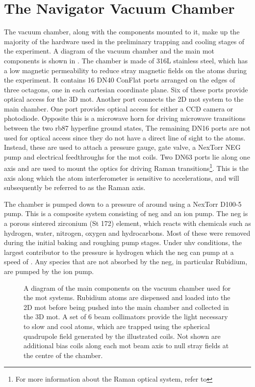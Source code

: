 \section{The Navigator Vacuum Chamber}\label{sec:vacuum_chamber}
The vacuum chamber, along with the components mounted to it, make up the
majority of the hardware used in the preliminary trapping and cooling stages of
the experiment. A diagram of the
vacuum chamber and the main \ac{mot} components is shown in
. The chamber is made of 316L stainless steel, which has a low magnetic permeability to reduce stray magnetic fields on the atoms during the experiment.  It contains 16 DN40 ConFlat ports arranged
on the edges of three octagons, one in each cartesian coordinate plane. Six of
these ports provide optical access for the 3D \ac{mot}. Another port connects the 2D \ac{mot} system to the main chamber. One port provides optical access for either a CCD camera or photodiode. Opposite this is a microwave horn for driving microwave transitions between the two \ac{rb87} hyperfine ground states, The remaining DN16 ports are not used for optical access since
they do not have a direct line of sight to the atoms. Instead, these are used to attach a pressure gauge, gate valve, a NexTorr NEG pump and electrical feedthroughs for the \ac{mot} coils. Two DN63
ports lie along one axis and are used to mount the optics for driving Raman transitions\footnote{For more information about the Raman optical system,
refer to }. This is the axis along which the atom interferometer is sensitive to
accelerations, and will subsequently be referred to as the Raman axis. \par\noindent  The chamber is pumped down to a pressure of around
\sivalue{}{\milli\bar} using a NexTorr D100-5 pump. This is a
composite system consisting of \ac{neg} and an ion pump. The \ac{neg} is a
porous sintered zirconium (St 172) element, which reacts with chemicals such as
hydrogen, water, nitrogen, oxygen and hydrocarbons. Most of these were removed
during the initial baking and roughing pump stages. Under \ac{uhv} conditions,
the largest contributor to the pressure is hydrogen which the \ac{neg} can pump
at a speed of . Any species that are not
absorbed by the \ac{neg}, in particular Rubidium, are pumped by the
 ion pump.
\begin{figure}[!htbp]
	\centering
	\def\svgwidth{1\textwidth}
	
	\caption[\ac{mot} system component diagram]{A diagram of the main components on the vacuum chamber used for the \ac{mot}
		systems. Rubidium atoms are dispensed and loaded into the 2D \ac{mot}
		before being pushed into the main chamber and collected in the 3D
		\ac{mot}. A set of 6 beam collimators provide the light necessary to
		slow and cool atoms, which are trapped using the spherical quadrupole
		field generated by the illustrated coils. Not shown are additional bias
		coils along each \ac{mot} beam axis to null stray fields at the centre
		of the chamber.}
	\label{fig:mot_system}
\end{figure}
